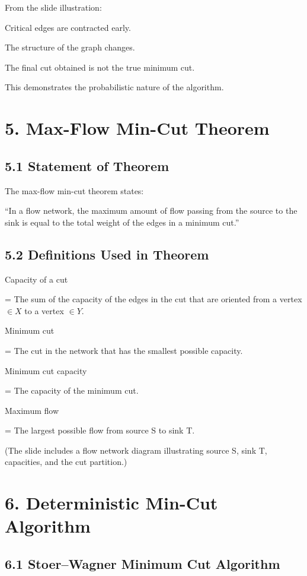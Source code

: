 \documentclass[11pt]{article}
\begin{document}
From the slide illustration:

Critical edges are contracted early.

The structure of the graph changes.

The final cut obtained is not the true minimum cut.

This demonstrates the probabilistic nature of the algorithm.

\section*{5. Max-Flow Min-Cut Theorem}

\subsection*{5.1 Statement of Theorem}

The max-flow min-cut theorem states:

“In a flow network, the maximum amount of flow passing from the source to the sink is equal to the total weight of the edges in a minimum cut.”

\subsection*{5.2 Definitions Used in Theorem}

Capacity of a cut

= The sum of the capacity of the edges in the cut that are oriented from a vertex $\in X$ to a vertex $\in Y$.

Minimum cut

= The cut in the network that has the smallest possible capacity.

Minimum cut capacity

= The capacity of the minimum cut.

Maximum flow

= The largest possible flow from source S to sink T.

(The slide includes a flow network diagram illustrating source S, sink T, capacities, and the cut partition.)

\section*{6. Deterministic Min-Cut Algorithm}

\subsection*{6.1 Stoer–Wagner Minimum Cut Algorithm}
\end{document}
